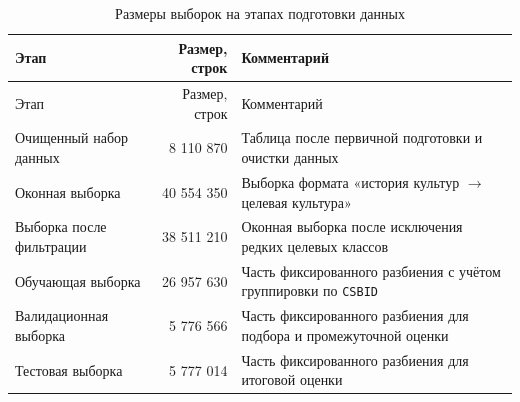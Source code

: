 \begin{center}
\small
\begin{longtable}{p{} r p{}}
\caption{Размеры выборок на этапах подготовки данных}
\label{tab:data-preparation-sizes}\\
\toprule
Этап & Размер, строк & Комментарий \\
\midrule
\endfirsthead

\toprule
Этап & Размер, строк & Комментарий \\
\midrule
\endhead

\bottomrule
\endlastfoot

Очищенный набор данных &
8 110 870 &
Таблица после первичной подготовки и очистки данных \\

Оконная выборка &
40 554 350 &
Выборка формата «история культур \(\rightarrow\) целевая культура» \\

Выборка после фильтрации &
38 511 210 &
Оконная выборка после исключения редких целевых классов \\

Обучающая выборка &
26 957 630 &
Часть фиксированного разбиения с учётом группировки по \texttt{CSBID} \\

Валидационная выборка &
5 776 566 &
Часть фиксированного разбиения для подбора и промежуточной оценки \\

Тестовая выборка &
5 777 014 &
Часть фиксированного разбиения для итоговой оценки \\

\end{longtable}
\end{center}